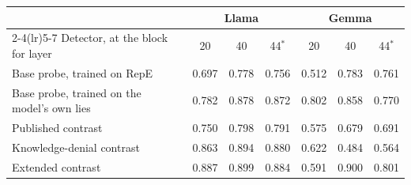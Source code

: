 \begin{tabular}{@{}l ccc ccc@{}}
\toprule
 & \multicolumn{3}{c}{Llama} & \multicolumn{3}{c}{Gemma} \\
\cmidrule(lr){2-4}\cmidrule(lr){5-7}
Detector, at the block for layer & 20 & 40 & 44$^*$ & 20 & 40 & 44$^*$ \\
\midrule
Base probe, trained on RepE & 0.697 & 0.778 & 0.756 & 0.512 & 0.783 & 0.761 \\
Base probe, trained on the model's own lies & 0.782 & 0.878 & 0.872 & 0.802 & 0.858 & 0.770 \\
Published contrast & 0.750 & 0.798 & 0.791 & 0.575 & 0.679 & 0.691 \\
Knowledge-denial contrast & 0.863 & 0.894 & 0.880 & 0.622 & 0.484 & 0.564 \\
Extended contrast & 0.887 & 0.899 & 0.884 & 0.591 & 0.900 & 0.801 \\
\bottomrule
\end{tabular}
